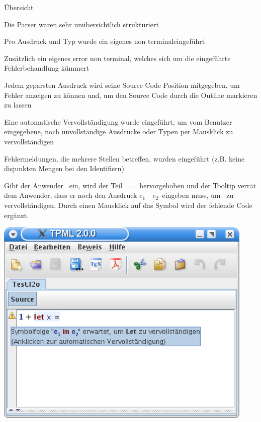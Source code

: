 {
  \begin{itemgroup}{Übersicht}
    \item Die Parser waren sehr unübersichtlich strukturiert
    \item Pro Ausdruck und Typ wurde ein eigenes \glqq non terminal\grqq eingeführt
    \item Zusätzlich ein eigenes \glqq error non terminal\grqq, welches sich um
          die eingeführte Fehlerbehandlung kümmert
    \item Jedem geparsten Ausdruck wird seine Source Code Position mitgegeben, um
          Fehler anzeigen zu können und, um den Source Code durch die Outline
          markieren zu lassen
    \item Eine automatische Vervollständigung wurde eingeführt, um vom Benutzer
          eingegebene, noch unvollständige Ausdrücke oder Typen per Mausklick
          zu vervollständigen
    \item Fehlermeldungen, die mehrere Stellen betreffen, wurden eingeführt
          (z.B. keine disjunkten Mengen bei den Identifiern) 
  \end{itemgroup}
}

{
  Gibt der Anwender \glqq {}\grqq\ 
  ein, wird der Teil \glqq \KeyLet\  =\grqq\ hervorgehoben und der Tooltip
  verrät dem Anwender, dass er noch den Ausdruck \glqq $e_1$\ \KeyIn\ $e_2$\grqq\ eingeben muss,
  um \glqq{\bf Let}\grqq\ zu vervollständigen. Durch einen Mausklick auf das Symbol wird der
  fehlende Code ergänzt.
  \begin{center}
    \includegraphics[height=10cm]{images/parser_auto.png}
  \end{center}
}

